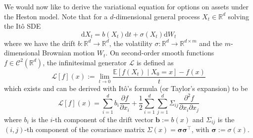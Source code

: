 We would now like to derive the variational equation for options on assets under the Heston model. Note that for a $d$-dimensional general process $X_t \in \mathbb R^d$ solving the Itô SDE
\begin{equation}
\mathrm dX_t = b(X_t) \mathrm dt + \sigma(X_t)\mathrm d W_t
\end{equation}
where we have the drift $b:\mathbb R^d \to \mathbb R^d$, the volatility $\sigma:\mathbb R^d \to \mathbb R^{d \times m}$ and the $m$-dimensional Brownian motion $W_t$. On second-order smooth functions $f \in \mathcal C^2(\mathbb R^d)$, the infinitesimal generator $\mathcal L$ is defined as \cite{bressloff2025sde}
\begin{equation}
\mathcal{L}[f](x) := \lim_{t \to 0}
\frac{\mathbb{E}[f(X_t) \mid X_0=x] - f(x)}{t}
\end{equation}
which exists and can be derived with Itô’s formula (or Taylor’s expansion) to be \cite{pham2009continuous}
\begin{equation}
\mathcal{L}[f](x)
= \sum_{i=1}^d b_i\frac{\partial f}{\partial x_i}
+ \frac12 \sum_{i=1}^d\sum_{j=1}^d
\Sigma_{ij} \frac{\partial ^2 f}{\partial x_i\partial x_j}
\end{equation}
where $b_i$ is the $i$-th component of the drift vector $\boldsymbol b := b(x)$ and $\Sigma_{ij}$ is the $(i, j)$-th component of the covariance matrix $\Sigma(x) = \boldsymbol \sigma \boldsymbol \sigma^\top$, with $\boldsymbol \sigma := \sigma(x)$.

